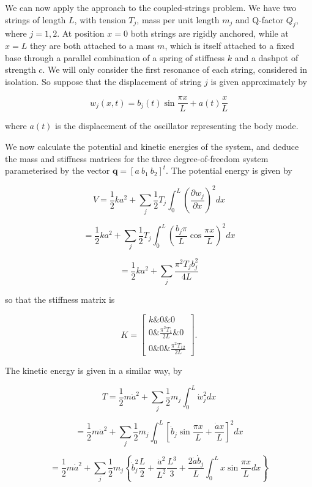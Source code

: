   We can now apply the approach to the coupled-strings problem. We have two 
  strings of length $L$, with tension $T_j$, mass per unit length $m_j$ and 
  Q-factor $Q_j$, where $j=1,2$. At position $x=0$ both strings are rigidly 
  anchored, while at $x=L$ they are both attached to a mass $m$, which is 
  itself attached to a fixed base through a parallel combination of a spring of 
  stiffness $k$ and a dashpot of strength $c$. We will only consider the first 
  resonance of each string, considered in isolation. So suppose that the 
  displacement of string $j$ is given approximately by 

  $$w_j(x,t) = b_j(t) \sin \dfrac{\pi x}{L} + a(t)\dfrac{x}{L} \tag{13}$$ 

  where $a(t)$ is the displacement of the oscillator representing the body 
  mode. 

  We now calculate the potential and kinetic energies of the system, and deduce 
  the mass and stiffness matrices for the three degree-of-freedom system 
  parameterised by the vector $\mathbf{q} = [a~b_1~b_2]^t$. The potential 
  energy is given by 

  $$V = \frac{1}{2} k a^2 +\sum_j{\dfrac{1}{2}T_j \int_0^L{\left( 
  \dfrac{\partial w_j}{\partial x} \right)^2 dx}} $$ 

  $$= \frac{1}{2} k a^2 +\sum_j{\dfrac{1}{2}T_j \int_0^L{\left( \dfrac{b_j 
  \pi}{L} \cos \dfrac{\pi x}{L}\right)^2 dx}} $$ 

  $$= \frac{1}{2} k a^2 +\sum_j{\dfrac{\pi^2 T_j b_j^2}{4L}} \tag{14}$$ 

  so that the stiffness matrix is 

  $$K =\begin{bmatrix}k \& 0 \& 0\\ 0 \& \frac{\pi^2 T_1}{2L} \& 0 \\ 0 \& 0 \& 
  \frac{\pi^2 T_12}{2L}\end{bmatrix} . \tag{15}$$ 

  The kinetic energy is given in a similar way, by 

  $$T = \frac{1}{2} m \dot{a}^2 +\sum_j{\dfrac{1}{2}m_j \int_0^L{\dot{w}_j^2 
  dx}} $$ 

  $$= \frac{1}{2} m \dot{a}^2 +\sum_j{\dfrac{1}{2}m_j \int_0^L{\left[\dot{b}_j 
  \sin \dfrac{\pi x}{L} + \dfrac{\dot{a}x}{L}\right]^2 dx}} $$ 

  $$= \frac{1}{2} m \dot{a}^2 +\sum_j{\dfrac{1}{2}m_j \left\lbrace \dot{b}_j^2 
  \dfrac{L}{2} + \dfrac{\dot{a}^2}{L^2} \dfrac{L^3}{3} + \dfrac{2 \dot{a} 
  \dot{b}_j}{L} \int_0^L{x \sin \dfrac{\pi x}{L} dx}\right\rbrace }$$ 

